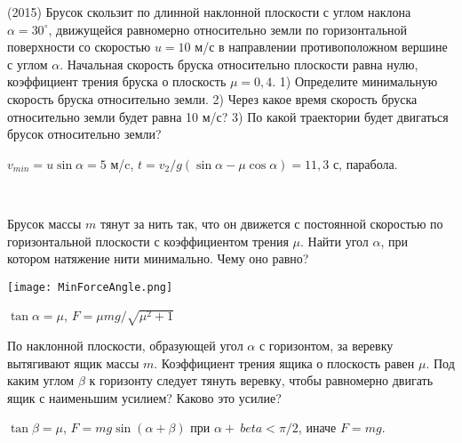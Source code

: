 \begin{ex}
(2015) Брусок скользит по длинной наклонной плоскости с углом наклона $\alpha = 30^{\circ}$, движущейся равномерно относительно земли по горизонтальной поверхности со скоростью $u = 10$ м/с в направлении противоположном вершине с углом $\alpha$. Начальная скорость бруска относительно плоскости равна нулю, коэффициент трения бруска о плоскость $\mu = 0,4$. 1) Определите минимальную скорость бруска относительно земли. 2) Через какое время скорость бруска относительно земли будет равна 10 м/с? 3) По какой траектории будет двигаться брусок относительно земли?
\begin{ans}
$v_{min} = u \sin \alpha = 5$ м/c, $t = v_2/g(\sin \alpha - \mu \cos \alpha) = 11,3$ с, парабола.
\end{ans}
\end{ex}

\begin{ex}
\hspace{0pt} \\
\begin{minipage}{.65\textwidth}
Брусок массы $m$ тянут за нить так, что он движется с постоянной скоростью по
горизонтальной плоскости с коэффициентом трения $\mu$. Найти угол $\alpha$, при котором натяжение нити минимально. Чему оно равно?
\end{minipage}
\begin{minipage}{.35\textwidth}
\centering
\texttt{[image: MinForceAngle.png]}
\end{minipage}
\begin{ans}
$\tan \alpha = \mu$, $F = \mu mg / \sqrt{\mu^2 + 1}$
\end{ans}
\end{ex}

\begin{ex}
По наклонной плоскости, образующей угол $\alpha$ с горизонтом, за веревку вытягивают ящик массы $m$. 
Коэффициент трения ящика о плоскость равен $\mu$. Под каким углом $\beta$ к горизонту следует тянуть веревку, 
чтобы равномерно двигать ящик с наименьшим усилием? Каково это усилие?
\begin{ans}
$\tan \beta = \mu$, $F = mg \sin (\alpha + \beta)$ при $\alpha + \ beta < \pi/2$, иначе $F = mg$.
\end{ans}
\end{ex}

